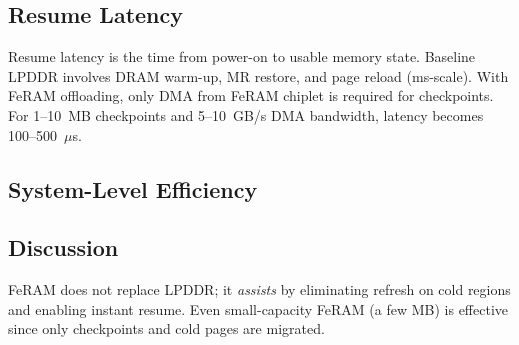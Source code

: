 \subsection{Resume Latency}
Resume latency is the time from power-on to usable memory state.
Baseline LPDDR involves DRAM warm-up, MR restore, and page reload (ms-scale).
With FeRAM offloading, only DMA from FeRAM chiplet is required for checkpoints.
For 1--10~MB checkpoints and 5--10~GB/s DMA bandwidth, latency becomes 100--500~$\mu$s.

\subsection{System-Level Efficiency}
\begin{table}[t]
  \centering
  \caption{System-level efficiency impact of LPDDR+FeRAM integration.}
  \label{tab:sys_efficiency}
  \small
  \setlength{\tabcolsep}{4pt}
  \vspace{-1.0mm}
\end{table}

\subsection{Discussion}
FeRAM does not replace LPDDR; it \emph{assists} by eliminating refresh on cold regions and enabling instant resume.
Even small-capacity FeRAM (a few MB) is effective since only checkpoints and cold pages are migrated.
